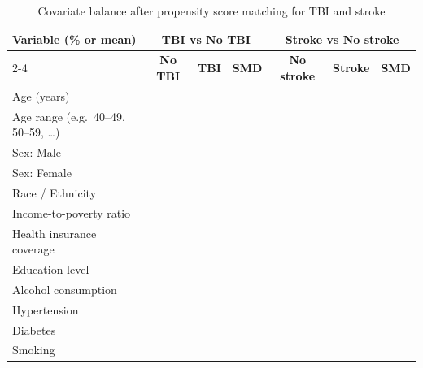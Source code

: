 \documentclass{article}
\begin{document}
\begin{table}[htbp]
\centering
\caption{Covariate balance after propensity score matching for TBI and stroke}
\label{tab:ps-balance-after}
\begin{tabular}{lcccccc}
\hline
\textbf{Variable (\% or mean)} &
\multicolumn{3}{c}{\textbf{TBI vs No TBI}} &
\multicolumn{3}{c}{\textbf{Stroke vs No stroke}} \\
\cline{2-4} \cline{5-7}
 & \textbf{No TBI} & \textbf{TBI} & \textbf{SMD} &
   \textbf{No stroke} & \textbf{Stroke} & \textbf{SMD} \\
\hline
Age (years) & & & & & & \\
Age range (e.g.\ 40--49, 50--59, \dots) & & & & & & \\
Sex: Male & & & & & & \\
Sex: Female & & & & & & \\
Race / Ethnicity & & & & & & \\
Income-to-poverty ratio & & & & & & \\
Health insurance coverage & & & & & & \\
Education level & & & & & & \\
Alcohol consumption & & & & & & \\
Hypertension & & & & & & \\
Diabetes & & & & & & \\
Smoking & & & & & & \\
\hline
\end{tabular}
\end{table}
\end{document}
